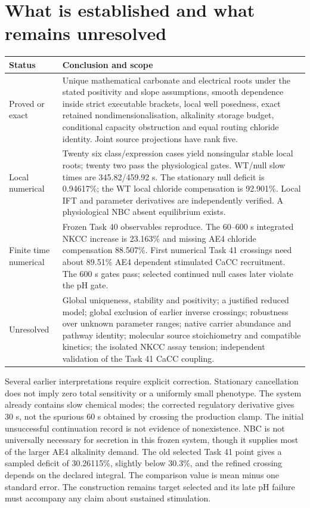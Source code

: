 \documentclass[11pt,a4paper]{article}
\begin{document}


\clearpage
\section{What is established and what remains unresolved}
\begin{longtable}{p{.17\linewidth}p{.76\linewidth}}
\toprule
Status & Conclusion and scope\\\midrule
\endhead
Proved or exact & Unique mathematical carbonate and electrical roots under
the stated positivity and slope assumptions, smooth dependence inside strict
executable brackets, local well posedness, exact retained nondimensionalisation,
alkalinity storage budget, conditional capacity obstruction and equal routing
chloride identity. Joint source projections have rank five.\\
Local numerical & Twenty six class/expression cases yield nonsingular stable
local roots; twenty two pass the physiological gates. WT/null slow times are
345.82/459.92 s. The stationary null deficit is 0.94617\%; the WT local
chloride compensation is 92.901\%. Local IFT and parameter derivatives
are independently verified. A physiological NBC absent equilibrium exists.\\
Finite time numerical & Frozen Task 40 observables reproduce. The 60--600 s
integrated NKCC increase is 23.163\% and missing AE4 chloride compensation
88.507\%. First numerical Task 41 crossings need about 89.51\% AE4 dependent
stimulated CaCC recruitment. The 600 s gates pass; selected continued null
cases later violate the pH gate.\\
Unresolved & Global uniqueness, stability and positivity; a justified reduced
model; global exclusion of earlier inverse crossings; robustness over unknown
parameter ranges; native carrier abundance and pathway identity; molecular
source stoichiometry and compatible kinetics; the isolated NKCC assay tension;
independent validation of the Task 41 CaCC coupling.\\\bottomrule
\end{longtable}

Several earlier interpretations require explicit correction. Stationary
cancellation does not imply zero total sensitivity or a uniformly small
phenotype. The system already contains slow chemical modes; the corrected
regulatory derivative gives 30 s, not the spurious 60 s obtained by crossing
the production clamp. The initial unsuccessful continuation record is not
evidence of nonexistence. NBC is not universally necessary for secretion
in this frozen system, though it supplies most of the larger AE4 alkalinity
demand. The old selected Task 41 point gives a sampled deficit of
30.26115\%, slightly below 30.3\%, and the refined crossing depends on
the declared integral. The comparison value is mean minus one standard
error. The construction remains target selected and its late pH failure
must accompany any claim about sustained stimulation.
\end{document}
